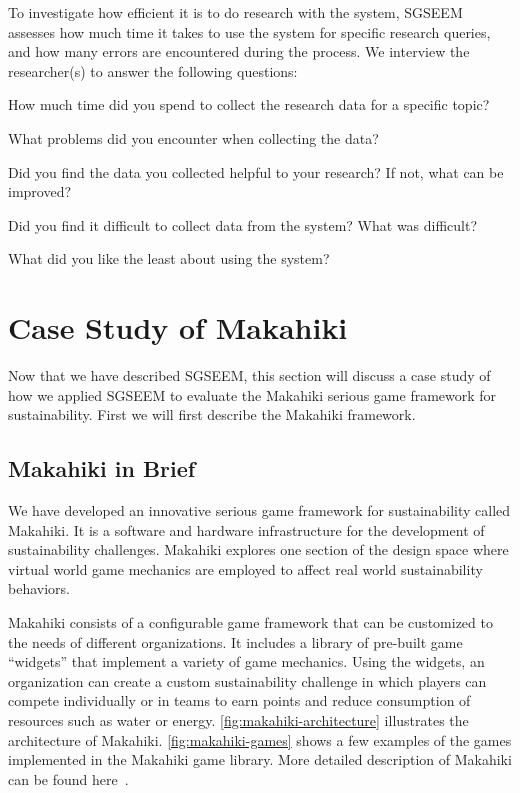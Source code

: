 \documentclass{sigchi}
\begin{document}
To investigate how efficient it is to do research with the system, SGSEEM
assesses how much time it takes to use the system for specific research
queries, and how many errors are encountered during the process. We
interview the researcher(s) to answer the following questions:
\begin{compactitem}
\item How much time did you spend to collect the research data for a
  specific topic?
\item What problems did you encounter when collecting the data?
\item Did you find the data you collected helpful to your research? If
  not, what can be improved?
\item Did you find it difficult to collect data from the system?
  What was difficult?
\item What did you like the least about using the system?
\end{compactitem}


\section{Case Study of Makahiki}

Now that we have described SGSEEM, this section will discuss
a case study of how we applied SGSEEM to evaluate the Makahiki serious
game framework for sustainability. First we will first describe the
Makahiki framework.

\subsection{Makahiki in Brief}

We have developed an innovative serious game framework for sustainability
called Makahiki. It is a software and hardware infrastructure for the development of
sustainability challenges. Makahiki explores one section of the design
space where virtual world game mechanics are employed to affect real
world sustainability behaviors.

Makahiki consists of a configurable game framework that can be customized
to the needs of different organizations. It includes a library of
pre-built game ``widgets'' that implement a variety of game mechanics.
Using the widgets, an organization can create a custom sustainability
challenge in which players can compete individually or in teams to
earn points and reduce consumption of resources such as water or energy.
\autoref{fig:makahiki-architecture} illustrates the architecture of
Makahiki. \autoref{fig:makahiki-games} shows a few examples of the
games implemented in the Makahiki game library. More detailed
description of Makahiki can be found here~\cite{csdl2-12-06}.
\end{document}
